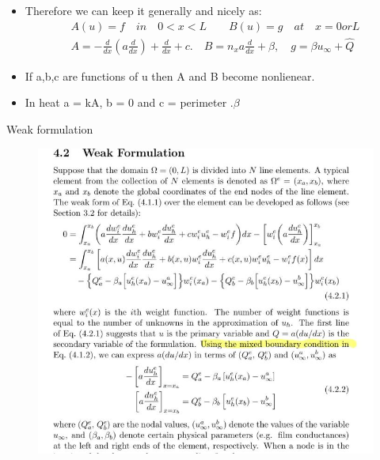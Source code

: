 	\begin{frame}
		\begin{itemize}
			\item Therefore we can keep it generally and nicely as:
			\begin{equation}
			\begin{aligned}
				A(u) = f \quad in \quad 0<x<L \qquad B(u) = g \quad at \quad x=0 or L \\
				A = -\frac{d}{dx}\left(a \frac{d}{dx} \right) +  \frac{d}{dx} + c. \quad B = n_x a \frac{d}{dx} + \beta, \quad g = \beta u_{\infty} + \hat{Q}
			\end{aligned}
			\end{equation}
			\item If a,b,c are functions of u then A and B become nonlienear.
			\item In heat a = kA, b = 0 and c = perimeter  $. \beta$
		\end{itemize}
	\end{frame}


	\begin{frame}{Weak formulation}
	\begin{figure}
			\centering
			\includegraphics[width=0.7\linewidth]{Figure/fig10} 
		\end{figure}
	\end{frame}


